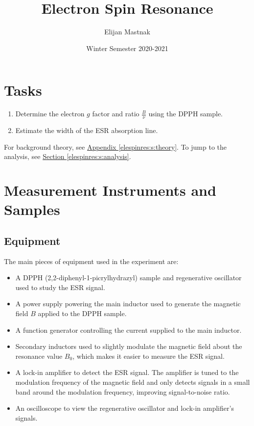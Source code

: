 \documentclass[11pt, a4paper]{article}
\begin{document}
\title{Electron Spin Resonance}
\author{Elijan Mastnak}
\date{Winter Semester 2020-2021}
\maketitle
\tableofcontents

\newpage


\section{Tasks}
\begin{enumerate}
	\item Determine the electron $ g $ factor and ratio $ \frac{B}{\nu} $ using the DPPH sample.
	\item Estimate the width of the ESR absorption line.
\end{enumerate}
For background theory, see \hyperref[elespinres:s:theory]{Appendix \ref{elespinres:s:theory}}. To jump to the analysis, see \hyperref[elespinres:s:analysis]{Section \ref{elespinres:s:analysis}}.

\section{Measurement Instruments and Samples}

\subsection{Equipment}
The main pieces of equipment used in the experiment are:
\begin{itemize}
	\item A DPPH (2,2-diphenyl-1-picrylhydrazyl) sample and regenerative oscillator used to study the ESR signal.
	
	\item A power supply powering the main inductor used to generate the magnetic field $ B $ applied to the DPPH sample.
	
	\item A function generator controlling the current supplied to the main inductor.
	
	\item Secondary inductors used to slightly modulate the magnetic field about the resonance value $ B_{0} $, which makes it easier to measure the ESR signal.
	
	\item A lock-in amplifier to detect the ESR signal. The amplifier is tuned to the modulation frequency of the magnetic field and only detects signals in a small band around the modulation frequency, improving signal-to-noise ratio.
	
	\item An oscilloscope to view the regenerative oscillator and lock-in amplifier's signals.
\end{itemize}
\end{document}

